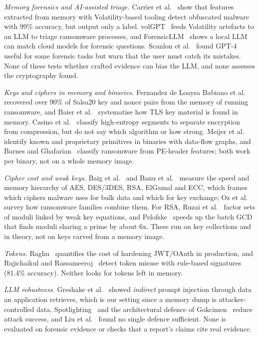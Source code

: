 \textit{Memory forensics and AI-assisted triage.} Carrier et al.~\cite{carrier2022detecting} show that features
extracted from memory with Volatility-based tooling detect obfuscated malware with 99\% accuracy, but output only
a label. volGPT~\cite{oh2024volgpt} feeds Volatility artefacts to an LLM to triage ransomware processes, and
ForensicLLM~\cite{sharma2025forensicllm} shows a local LLM can match cloud models for forensic questions.
Scanlon et al.~\cite{scanlon2023chatgpt} found GPT-4 useful for some forensic tasks but warn that the user must
catch its mistakes. None of these tests whether crafted evidence can bias the LLM, and none assesses the
cryptography found.

\textit{Keys and ciphers in memory and binaries.} Fernandez de Loaysa Babiano et al.~\cite{babiano2023evaluation}
recovered over 90\% of Salsa20 key and nonce pairs from the memory of running ransomware, and Baier et
al.~\cite{baier2024tls} systematise how TLS key material is found in memory. Casino et al.~\cite{casino2025not}
classify high-entropy segments to separate encryption from compression, but do not say which algorithm or how
strong. Meijer et al.~\cite{meijer2021wheres} identify known and proprietary primitives in binaries with
data-flow graphs, and Barnes and Ghafarian~\cite{barnes2026machine} classify ransomware from PE-header features;
both work per binary, not on a whole memory image.

\textit{Cipher cost and weak keys.} Baig et al.~\cite{baig2024comparative} and Banu et al.~\cite{banu2025analyzing}
measure the speed and memory hierarchy of AES, DES/3DES, RSA, ElGamal and ECC, which frames which ciphers malware
uses for bulk data and which for key exchange; Oz et al.~\cite{oz2022survey} survey how ransomware families
combine them. For RSA, Ruzai et al.~\cite{ruzai2024concurrent} factor sets of moduli linked by weak key
equations, and Pelofske~\cite{pelofske2024efficient} speeds up the batch GCD that finds moduli sharing a prime by
about 6x. These run on key collections and in theory, not on keys carved from a memory image.

\textit{Tokens.} Raghu~\cite{raghu2025context} quantifies the cost of hardening JWT/OAuth in production, and
Rujichaikul and Rassameeroj~\cite{rujichaikul2025token} detect token misuse with rule-based signatures (81.4\%
accuracy). Neither looks for tokens left in memory.

\textit{LLM robustness.} Greshake et al.~\cite{greshake2023not} showed \emph{indirect} prompt injection through data
an application retrieves, which is our setting since a memory dump is attacker-controlled data.
Spotlighting~\cite{hines2024spotlighting} and the architectural defence of Gokcimen~\cite{gokcimen2025novel} reduce
attack success, and Liu et al.~\cite{liu2024formalizing} found no single defence sufficient. None is evaluated on
forensic evidence or checks that a report's claims cite real evidence.

